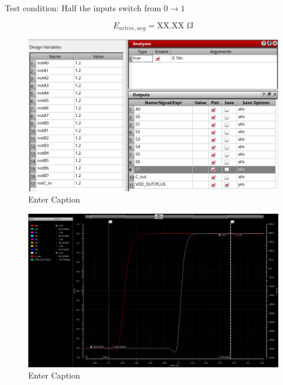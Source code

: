 \documentclass[12pt,letterpaper]{article}
\begin{document}
Test condition: Half the inputs switch from $0 \rightarrow 1$

\begin{equation}
E_{active,avg} = \text{XX.XX fJ}
\end{equation}



\begin{figure}[H]
    \centering
    \includegraphics[width=\linewidth]{writeup//figures//baseline//active_energy/avg_switching_energy_adel.png}
    \caption{Enter Caption}
\end{figure}

\begin{figure}[H]
    \centering
    \includegraphics[width=1\linewidth]{writeup//figures//baseline//active_energy/avg_switching_energy_inputs.png}
    \caption{Enter Caption}
\end{figure}
\end{document}
